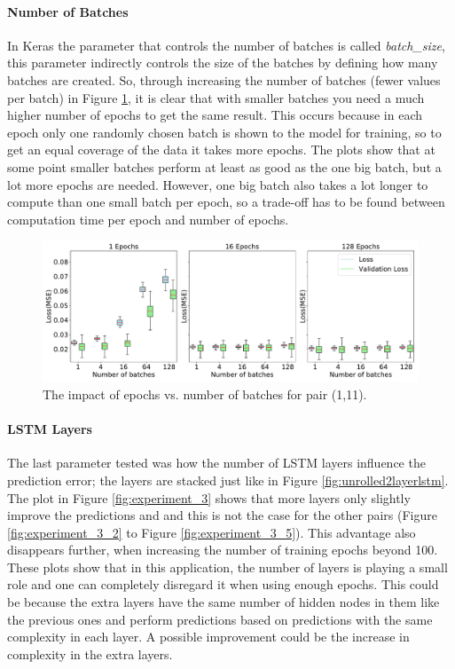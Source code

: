 \paragraph{Number of Batches}
In Keras the parameter that controls the number of batches is called \textit{batch\_size}, this parameter indirectly controls the size of the batches by defining how many batches are created.
So, through increasing the number of batches (fewer values per batch) in Figure \ref{fig:experiment_4}, it is clear that with smaller batches you need a much higher number of epochs to get the same result.
This occurs because in each epoch only one randomly chosen batch is shown to the model for training, so to get an equal coverage of the data it takes more epochs.
The plots show that at some point smaller batches perform at least as good as the one big batch, but a lot more epochs are needed.
However, one big batch also takes a lot longer to compute than one small batch per epoch, so a trade-off has to be found between computation time per epoch and number of epochs.
\begin{figure}
	\centering
	\includegraphics[width=1\linewidth]{Pictures/Results/experiment_4_1}
	\caption{The impact of epochs vs. number of batches for pair (1,11).}
	\label{fig:experiment_4}
\end{figure}

\paragraph{LSTM Layers}
The last parameter tested was how the number of LSTM layers influence the prediction error; the layers are stacked just like in Figure \ref{fig:unrolled2layerlstm}.
The plot in Figure \ref{fig:experiment_3} shows that more layers only slightly improve the predictions and and this is not the case for the other pairs (Figure \ref{fig:experiment_3_2} to Figure \ref{fig:experiment_3_5}).
This advantage also disappears further, when increasing the number of training epochs beyond 100.
These plots show that in this application, the number of layers is playing a small role and one can completely disregard it when using enough epochs.
This could be because the extra layers have the same number of hidden nodes in them like the previous ones and perform predictions based on predictions with the same complexity in each layer.
A possible improvement could be the increase in complexity in the extra layers.

